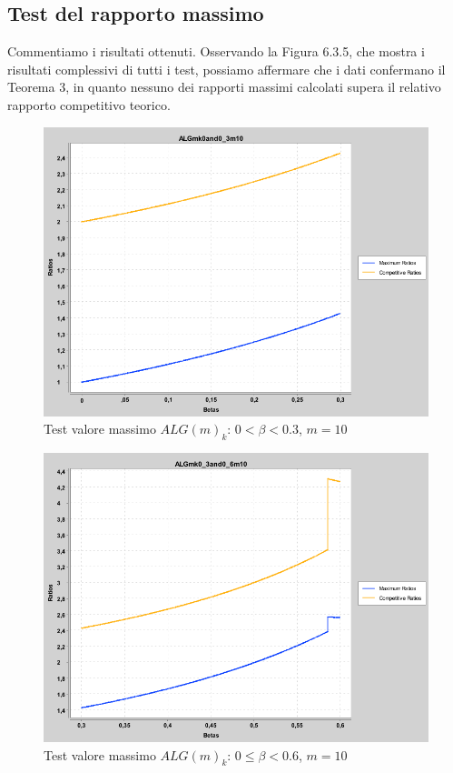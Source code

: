 \documentclass[twoside,openany,titlepage,fleqn,
	headinclude,12pt,a4paper,BCOR5mm,footinclude]{scrbook}
\begin{document}
\subsection{Test del rapporto massimo}
Commentiamo i risultati ottenuti. Osservando la Figura 6.3.5, che mostra i risultati complessivi di tutti i test, possiamo affermare che i dati confermano il Teorema 3, in quanto nessuno dei rapporti massimi calcolati supera il relativo rapporto competitivo teorico.
\setcounter{figure}{0} 
\begin{figure}[H]
\caption[Test valore massimo $ALG(m)_{k}$: $0 < \beta < 0.3$]{Test valore massimo $ALG(m)_{k}$: $0 < \beta < 0.3$, $m = 10$}
\centering
\includegraphics[scale=0.4]{max/ALGmk0and0_3m10.png}
\end{figure}
\begin{figure}[H]
\caption[Test valore massimo $ALG(m)_{k}$: $0 \leq \beta < 0.6$]{Test valore massimo $ALG(m)_{k}$: $0 \leq \beta < 0.6$, $m = 10$}
\centering
\includegraphics[scale=0.4]{max/ALGmk0_3and0_6m10.png}
\end{figure}
\end{document}
